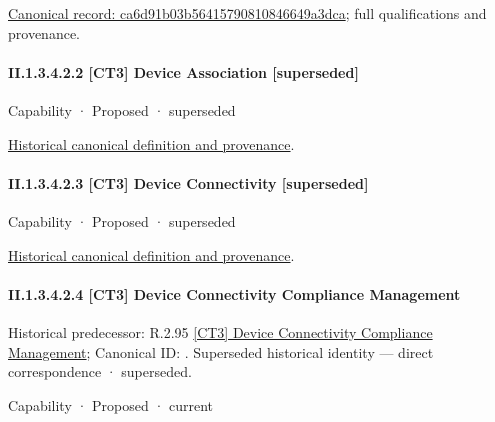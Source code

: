 {\footnotesize \href{../../../../continuum/strategy/capability/feature/ca6d91b03b56415790810846649a3dca.md}{Canonical record: ca6d91b03b56415790810846649a3dca}; full qualifications and provenance.}\par
\paragraph*{II.1.3.4.2.2 [CT3] Device Association [superseded]}
\label{navigation:II.1.3.4.2.2}

\label{element:902daf2ce9714876bbfee52eef1a7ab0}
{\small Capability · Proposed · superseded}\par
\href{../../../../continuum/strategy/capability/902daf2ce9714876bbfee52eef1a7ab0.md}{Historical canonical definition and provenance}.\par
\paragraph*{II.1.3.4.2.3 [CT3] Device Connectivity [superseded]}
\label{navigation:II.1.3.4.2.3}

\label{element:658d4b6770a943bcb5801fb7ca9b47be}
{\small Capability · Proposed · superseded}\par
\href{../../../../continuum/strategy/capability/658d4b6770a943bcb5801fb7ca9b47be.md}{Historical canonical definition and provenance}.\par
\paragraph*{II.1.3.4.2.4 [CT3] Device Connectivity Compliance Management}
\label{navigation:II.1.3.4.2.4}

{\small Historical predecessor: R.2.95 \hyperref[element:9225f083d3474715a75af2a827a4016d]{[CT3] Device Connectivity Compliance Management}; Canonical ID: \texttt{}. Superseded historical identity — direct correspondence · superseded.}\par
\label{element:b16ab359030a4583868f3aac2221074e}
{\small Capability · Proposed · current}\par

